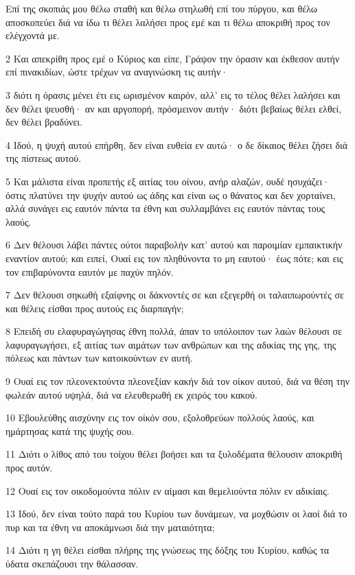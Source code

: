 \par Επί της σκοπιάς μου θέλω σταθή και θέλω στηλωθή επί του πύργου, και θέλω αποσκοπεύει διά να ίδω τι θέλει λαλήσει προς εμέ και τι θέλω αποκριθή προς τον ελέγχοντά με.
\par 2 Και απεκρίθη προς εμέ ο Κύριος και είπε, Γράψον την όρασιν και έκθεσον αυτήν επί πινακιδίων, ώστε τρέχων να αναγινώσκη τις αυτήν·
\par 3 διότι η όρασις μένει έτι εις ωρισμένον καιρόν, αλλ' εις το τέλος θέλει λαλήσει και δεν θέλει ψευσθή· αν και αργοπορή, πρόσμεινον αυτήν· διότι βεβαίως θέλει ελθεί, δεν θέλει βραδύνει.
\par 4 Ιδού, η ψυχή αυτού επήρθη, δεν είναι ευθεία εν αυτώ· ο δε δίκαιος θέλει ζήσει διά της πίστεως αυτού.
\par 5 Και μάλιστα είναι προπετής εξ αιτίας του οίνου, ανήρ αλαζών, ουδέ ησυχάζει· όστις πλατύνει την ψυχήν αυτού ως άδης και είναι ως ο θάνατος και δεν χορταίνει, αλλά συνάγει εις εαυτόν πάντα τα έθνη και συλλαμβάνει εις εαυτόν πάντας τους λαούς.
\par 6 Δεν θέλουσι λάβει πάντες ούτοι παραβολήν κατ' αυτού και παροιμίαν εμπαικτικήν εναντίον αυτού; και ειπεί, Ουαί εις τον πληθύνοντα το μη εαυτού· έως πότε; και εις τον επιβαρύνοντα εαυτόν με παχύν πηλόν.
\par 7 Δεν θέλουσι σηκωθή εξαίφνης οι δάκνοντές σε και εξεγερθή οι ταλαιπωρούντές σε και θέλεις είσθαι προς αυτούς εις διαρπαγήν;
\par 8 Επειδή συ ελαφυραγώγησας έθνη πολλά, άπαν το υπόλοιπον των λαών θέλουσι σε λαφυραγωγήσει, εξ αιτίας των αιμάτων των ανθρώπων και της αδικίας της γης, της πόλεως και πάντων των κατοικούντων εν αυτή.
\par 9 Ουαί εις τον πλεονεκτούντα πλεονεξίαν κακήν διά τον οίκον αυτού, διά να θέση την φωλεάν αυτού υψηλά, διά να ελευθερωθή εκ χειρός του κακού.
\par 10 Εβουλεύθης αισχύνην εις τον οίκόν σου, εξολοθρεύων πολλούς λαούς, και ημάρτησας κατά της ψυχής σου.
\par 11 Διότι ο λίθος από του τοίχου θέλει βοήσει και τα ξυλοδέματα θέλουσιν αποκριθή προς αυτόν.
\par 12 Ουαί εις τον οικοδομούντα πόλιν εν αίμασι και θεμελιούντα πόλιν εν αδικίαις.
\par 13 Ιδού, δεν είναι τούτο παρά του Κυρίου των δυνάμεων, να μοχθώσιν οι λαοί διά το πυρ και τα έθνη να αποκάμνωσι διά την ματαιότητα;
\par 14 Διότι η γη θέλει είσθαι πλήρης της γνώσεως της δόξης του Κυρίου, καθώς τα ύδατα σκεπάζουσι την θάλασσαν.

